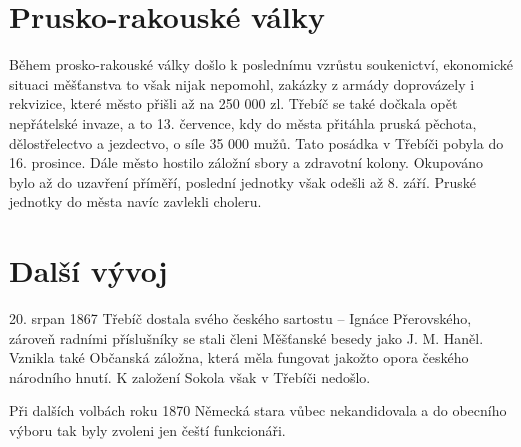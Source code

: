 \documentclass[a4paper,oneside,12p]{report}
\let\openright=\clearpage
\begin{document}
\section{Prusko-rakouské války}

Během prosko-rakouské války došlo k poslednímu vzrůstu soukenictví, ekonomické situaci měšťanstva to však nijak nepomohl, zakázky z armády doprovázely i rekvizice, které město přišli až na 250 000 zl.
Třebíč se také dočkala opět nepřátelské invaze, a to 13. července, kdy do města přitáhla pruská pěchota, dělostřelectvo a jezdectvo, o síle 35 000 mužů.
Tato posádka v Třebíči pobyla do 16. prosince.
Dále město hostilo záložní sbory a zdravotní kolony.
Okupováno bylo až do uzavření příměří, poslední jednotky však odešli až 8. září.
Pruské jednotky do města navíc zavlekli choleru.

\section{Další vývoj}

20. srpan 1867 Třebíč dostala svého českého sartostu -- Ignáce Přerovského, zároveň radními příslušníky se stali členi Měšťanské besedy jako J. M. Haněl.
Vznikla také Občanská záložna, která měla fungovat jakožto opora českého národního hnutí.
K založení Sokola však v Třebíči nedošlo.

Při dalších volbách roku 1870 Německá stara vůbec nekandidovala a do obecního výboru tak byly zvoleni jen čeští funkcionáři.




\listoffigures
\openright
\end{document}
